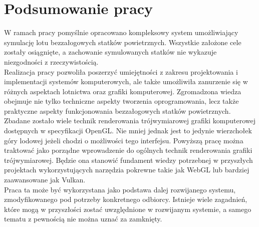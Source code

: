 \section{Podsumowanie pracy}


W ramach pracy pomyślnie opracowano kompleksowy system umożliwiający symulację lotu bezzałogowych statków powietrznych. Wszystkie założone cele zostały osiągnięte, a zachowanie symulowanych statków nie wykazuje niezgodności z rzeczywistością.\\

Realizacja pracy pozwoliła poszerzyć umiejętności z zakresu projektowania i implementacji systemów komputerowych, ale także umożliwiła zanurzenie się w różnych aspektach lotnictwa oraz grafiki komputerowej. Zgromadzona wiedza obejmuje nie tylko techniczne aspekty tworzenia oprogramowania, lecz także praktyczne aspekty funkcjonowania bezzałogowych statków powietrznych.\\

Zbadane zostało wiele technik renderowania trójwymiarowej grafiki komputerowej dostępnych w specyfikacji OpenGL. Nie mniej jednak jest to jedynie wierzchołek góry lodowej jeżeli chodzi o możliwości tego interfejsu. Powyższą pracę można traktować jako porządne wprowadzenie do ogólnych technik renderowania grafiki trójwymiarowej. Będzie ona stanowić fundament wiedzy potrzebnej w przyszłych projektach wykorzystujących narzędzia pokrewne takie jak WebGL lub bardziej zaawansowane jak Vulkan. \\

Praca ta może być wykorzystana jako podstawa dalej rozwijanego systemu, zmodyfikowanego pod potrzeby konkretnego odbiorcy. Istnieje wiele zagadnień, które mogą w przyszłości zostać uwzględnione w rozwijanym systemie, a samego tematu z pewnością nie można uznać za zamknięty.